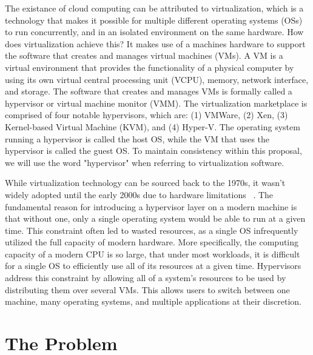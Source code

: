 \documentclass{report}
\begin{document}
\begin{spacing}{1.5}
{\large
\noindent The existance of cloud computing can be attributed to virtualization, which is a technology that makes it possible for multiple different operating systems (OSs) to run concurrently, and in an isolated environment on the same hardware. How does virtualization achieve this? It makes use of a machines hardware to support the software that creates and manages virtual machines (VMs). A VM is a virtual environment that provides the functionality of a physical computer by using its own virtual central processing unit (VCPU), memory, network interface, and storage. The software that creates and manages VMs is formally called a hypervisor or virtual machine monitor (VMM). The virtualization marketplace is comprised of four notable hypervisors, which are: (1) VMWare, (2) Xen, (3) Kernel-based Virtual Machine (KVM), and (4) Hyper-V. The operating system running a hypervisor is called the host OS, while the VM that uses the hypervisor is called the guest OS. To maintain consistency within this proposal, we will use the word "hypervisor" when referring to virtualization software.
\newline
}

{\large
\noindent While virtualization technology can be sourced back to the 1970s, it wasn’t widely adopted until the early 2000s due to hardware limitations ~\cite{popek1974formal}. The fundamental reason for introducing a hypervisor layer on a modern machine is that without one, only a single operating system would be able to run at a given time. This constraint often led to wasted resources, as a single OS infrequently utilized the full capacity of modern hardware. More specifically, the computing capacity of a modern CPU is so large, that under most workloads, it is difficult for a single OS to efficiently use all of its resources at a given time. Hypervisors address this constraint by allowing all of a system’s resources to be used by distributing them over several VMs. This allows users to switch between one machine, many operating systems, and multiple applications at their discretion.
\newline
}



\section{The Problem}


\end{spacing}
\end{document}
